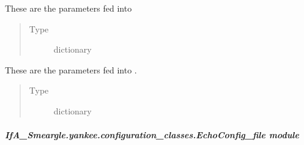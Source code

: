 \documentclass[letterpaper,10pt,english]{sphinxmanual}
\begin{document}
\begin{fulllineitems}
\begin{fulllineitems}
\label{\detokenize{python_docstrings/IfA_Smeargle.yankee.configuration_classes.BravoConfig_file:IfA_Smeargle.yankee.configuration_classes.BravoConfig_file.BravoConfig.voltpat_rename_config}}
These are the parameters fed into 
\begin{quote}\begin{description}
\item[{Type}] \leavevmode
dictionary

\end{description}\end{quote}

\end{fulllineitems}


\begin{fulllineitems}
\label{\detokenize{python_docstrings/IfA_Smeargle.yankee.configuration_classes.BravoConfig_file:IfA_Smeargle.yankee.configuration_classes.BravoConfig_file.BravoConfig.avg_endpts_config}}
These are the parameters fed into .
\begin{quote}\begin{description}
\item[{Type}] \leavevmode
dictionary

\end{description}\end{quote}

\end{fulllineitems}


\end{fulllineitems}



\subparagraph{IfA\_Smeargle.yankee.configuration\_classes.EchoConfig\_file module}
\label{\detokenize{python_docstrings/IfA_Smeargle.yankee.configuration_classes.EchoConfig_file:module-IfA_Smeargle.yankee.configuration_classes.EchoConfig_file}}\label{\detokenize{python_docstrings/IfA_Smeargle.yankee.configuration_classes.EchoConfig_file:ifa-smeargle-yankee-configuration-classes-echoconfig-file-module}}\label{\detokenize{python_docstrings/IfA_Smeargle.yankee.configuration_classes.EchoConfig_file::doc}}
\end{document}
